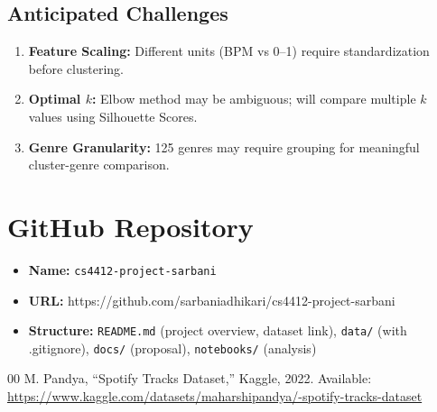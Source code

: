 \documentclass[10pt,twocolumn]{article}
\begin{document}
\subsection{Anticipated Challenges}
\begin{enumerate}
    \item \textbf{Feature Scaling:} Different units (BPM vs 0--1) require standardization before clustering.
    \item \textbf{Optimal $k$:} Elbow method may be ambiguous; will compare multiple $k$ values using Silhouette Scores.
    \item \textbf{Genre Granularity:} 125 genres may require grouping for meaningful cluster-genre comparison.
\end{enumerate}

\section{GitHub Repository}

\begin{itemize}
    \item \textbf{Name:} \texttt{cs4412-project-sarbani}
    \item \textbf{URL:} https://github.com/sarbaniadhikari/cs4412-project-sarbani
    \item \textbf{Structure:} \texttt{README.md} (project overview, dataset link), \texttt{data/} (with .gitignore), \texttt{docs/} (proposal), \texttt{notebooks/} (analysis)
\end{itemize}

\begin{thebibliography}{00}
 M. Pandya, ``Spotify Tracks Dataset,'' Kaggle, 2022. Available: \url{https://www.kaggle.com/datasets/maharshipandya/-spotify-tracks-dataset}
\end{thebibliography}
\end{document}
